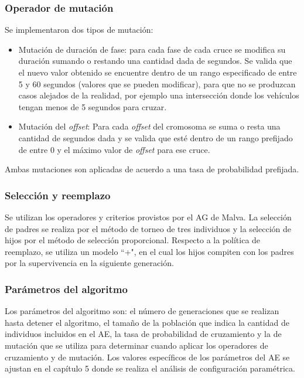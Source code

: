 \subsubsection{Operador de mutación}
Se implementaron dos tipos de mutación:
\begin{itemize}
	
	\item Mutación de duración de fase: para cada fase de cada cruce se modifica su duración sumando o restando una cantidad dada de segundos. Se valida que el nuevo valor obtenido se encuentre dentro de un rango especificado de entre 5 y 60 segundos (valores que se pueden modificar), para que no se produzcan casos alejados de la realidad, por ejemplo una intersección donde los vehículos tengan menos de 5 segundos para cruzar.
	
	\item Mutación del \emph{offset}: Para cada \emph{offset} del cromosoma se suma o resta una cantidad de segundos dada y se valida que esté dentro de un rango prefijado de entre 0 y el máximo valor de \emph{offset} para ese cruce.
	

\end{itemize}
Ambas mutaciones son aplicadas de acuerdo a una tasa de probabilidad prefijada.

\subsubsection{Selección y reemplazo}
Se utilizan los operadores y criterios provistos por el AG de Malva. La selección de padres se realiza por el método de torneo de tres individuos y la selección de hijos por el método de selección proporcional. Respecto a la política de reemplazo, se utiliza un modelo ``+", en el cual los hijos compiten con los padres por la supervivencia en la siguiente generación.

\subsubsection{Parámetros del algoritmo}
Los parámetros del algoritmo son: el número de generaciones que se realizan hasta detener el algoritmo, el tamaño de la población que indica la cantidad de individuos incluidos en el AE, la tasa de probabilidad de cruzamiento y la de mutación que se utiliza para determinar cuando aplicar los operadores de cruzamiento y de mutación. Los valores específicos de los parámetros del AE se ajustan en el capítulo 5 donde se realiza el análisis de configuración paramétrica. 

